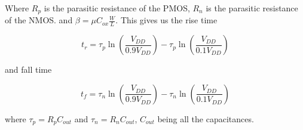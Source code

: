 Where $R_p$ is the parasitic resistance of the PMOS, $R_n$ is the parasitic resistance of the NMOS. and $\beta=\mu C_{ox}\frac{W}{L}$. This gives us the rise time

\begin{equation}
    t_r=\tau_p \ln \left(\frac{V_{DD}}{0.9V_{DD}}\right)-\tau_p \ln \left(\frac{V_{DD}}{0.1V_{DD}}\right)
    \label{eq:risetime}
\end{equation}

and fall time

\begin{equation}
    t_f=\tau_n \ln \left(\frac{V_{DD}}{0.9V_{DD}}\right)-\tau_n \ln \left(\frac{V_{DD}}{0.1V_{DD}}\right)
    \label{eq:falltime}
\end{equation}

where $\tau_p=R_pC_{out}$ and $\tau_n=R_nC_{out}$, $C_{out}$ being all the capacitances. \cite{departmentofelectronicsystemsntnu_2023_delay}
